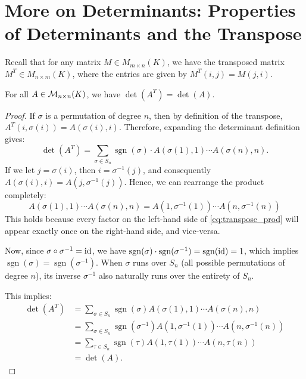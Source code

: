 \section{More on Determinants: Properties of Determinants and the Transpose}

Recall that for any matrix $M \in M_{m \times n}(K)$, we have the transposed matrix $M^T \in M_{n \times m}(K)$, where the entries are given by $M^T(i,j) = M(j,i)$.

\begin{theorem}
  \label{thm:det_transpose}
  For all $A \in \mathcal{M}_{n \times n}(K)$, we have $\det(A^T) = \det(A)$.
\end{theorem}

\begin{proof}
  If $\sigma$ is a permutation of degree $n$, then by definition of the transpose, $A^T(i, \sigma(i)) = A(\sigma(i), i)$.
  Therefore, expanding the determinant definition gives:
  \[
  \det(A^T) = \sum_{\sigma \in S_n} \operatorname{sgn}(\sigma) \cdot A(\sigma(1), 1) \cdots A(\sigma(n), n).
  \]
  If we let $j = \sigma(i)$, then $i = \sigma^{-1}(j)$, and consequently $A(\sigma(i), i) = A(j, \sigma^{-1}(j))$. Hence, we can rearrange the product completely:
  \begin{equation} \label{eq:transpose_prod}
    A(\sigma(1), 1) \cdots A(\sigma(n), n) = A(1, \sigma^{-1}(1)) \cdots A(n, \sigma^{-1}(n))
  \end{equation}
  This holds because every factor on the left-hand side of \eqref{eq:transpose_prod} will appear exactly once on the right-hand side, and vice-versa.

  Now, since $\sigma \circ \sigma^{-1} = \operatorname{id}$, we have $\operatorname{sgn}(\sigma) \cdot \operatorname{sgn}(\sigma^{-1}) = \operatorname{sgn}(\operatorname{id}) = 1$, which implies $\operatorname{sgn}(\sigma) = \operatorname{sgn}(\sigma^{-1})$.
  When $\sigma$ runs over $S_n$ (all possible permutations of degree $n$), its inverse $\sigma^{-1}$ also naturally runs over the entirety of $S_n$.

  This implies:
  \begin{align*}
    \det(A^T) &= \sum_{\sigma \in S_n} \operatorname{sgn}(\sigma) A(\sigma(1), 1) \cdots A(\sigma(n), n) \\
    &= \sum_{\sigma \in S_n} \operatorname{sgn}(\sigma^{-1}) A(1, \sigma^{-1}(1)) \cdots A(n, \sigma^{-1}(n)) \\
    &= \sum_{\tau \in S_n} \operatorname{sgn}(\tau) A(1, \tau(1)) \cdots A(n, \tau(n)) \\
    &= \det(A).
  \end{align*}
\end{proof}

